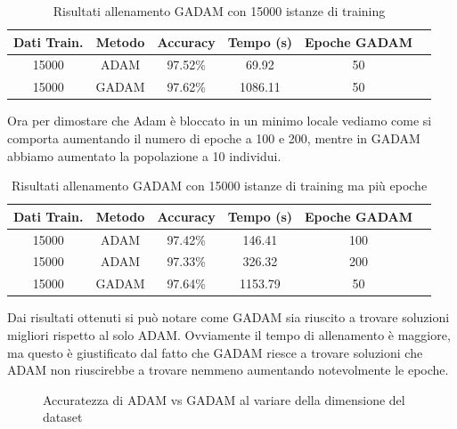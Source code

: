 \begin{table}[htbp]
\centering
\begin{tabular}{|c|c|c|c|c|c|}
\hline
\textbf{Dati Train.} & \textbf{Metodo} & \textbf{Accuracy}& \textbf{Tempo (s)} & \textbf{Epoche GADAM} \\
\hline
15000 & ADAM & 97.52\%  & 69.92 & 50 \\
\hline
15000 & GADAM & 97.62\%  & 1086.11 & 50\\
\hline
\end{tabular}
\label{tab:GADAM_results_15000}
\caption{Risultati allenamento GADAM con 15000 istanze di training}
\end{table}
    Ora per dimostare che Adam è bloccato in un minimo locale vediamo come si comporta aumentando il numero di epoche a 100 e 200, mentre in GADAM abbiamo aumentato la popolazione a 10 individui.
\begin{table}[H]
    \centering
    \begin{tabular}{|c|c|c|c|c|c|}
    \hline
    \textbf{Dati Train.} & \textbf{Metodo} & \textbf{Accuracy}& \textbf{Tempo (s)} & \textbf{Epoche GADAM} \\
    \hline
    15000 & ADAM & 97.42\%  & 146.41 & 100 \\
    \hline
    15000 & ADAM & 97.33\%  & 326.32 & 200\\
    \hline
    15000 & GADAM & 97.64\%  & 1153.79  & 50\\
    \hline
    \end{tabular}
    \label{tab:GADAM_results_15000_update}
    \caption{Risultati allenamento GADAM con 15000 istanze di training ma più epoche}
    \end{table}

    Dai risultati ottenuti si può notare come GADAM sia riuscito a trovare soluzioni migliori rispetto al solo ADAM.
    Ovviamente il tempo di allenamento è maggiore, ma questo è giustificato dal fatto che GADAM riesce a trovare soluzioni che ADAM non riuscirebbe a trovare nemmeno aumentando notevolmente le epoche.


\begin{figure}[htbp]
    \centering
    \caption{Accuratezza di ADAM vs GADAM al variare della dimensione del dataset}
    \end{figure}
    